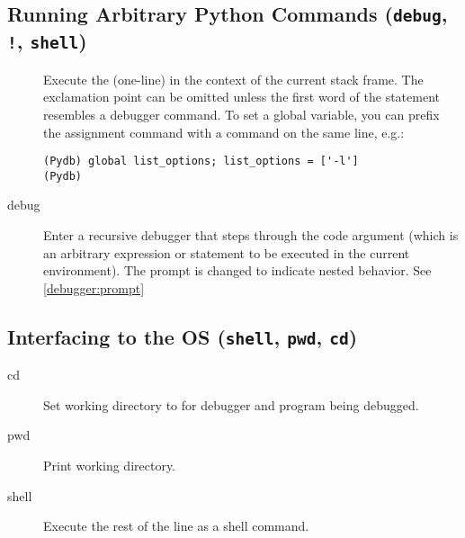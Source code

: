 \subsection{Running Arbitrary Python Commands ({\tt debug}, {\tt !},
  {\tt shell})\label{subsection-commands}}

\begin{description}

\item[\optional{!}]

Execute the (one-line)  in the context of
the current stack frame.
The exclamation point can be omitted unless the first word
of the statement resembles a debugger command.
To set a global variable, you can prefix the assignment
command with a  command on the same line, e.g.:

\begin{verbatim}
(Pydb) global list_options; list_options = ['-l']
(Pydb)
\end{verbatim}

\item[debug ]

Enter a recursive debugger that steps through the code argument (which
is an arbitrary expression or statement to be executed in the current
environment). The prompt is changed to indicate nested behavior. See
\ref{debugger:prompt}

\end{description}

\subsection{Interfacing to the OS ({\tt shell}, {\tt pwd},
  {\tt cd})\label{subsection-os}}

\begin{description}

\item[cd ]

Set working directory to  for debugger and program
being debugged.

\item[pwd]

Print working directory.  

\item[shell ]

Execute the rest of the line as a shell command.


\end{description}

